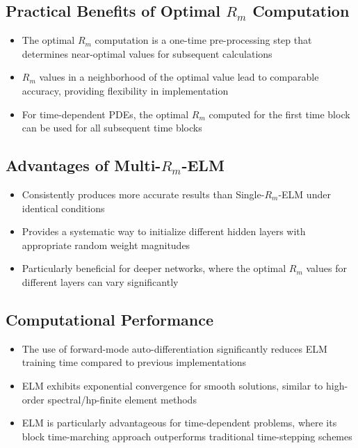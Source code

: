 \documentclass[11pt,a4paper]{article}
\begin{document}
\subsection{Practical Benefits of Optimal $R_m$ Computation}

\begin{itemize}
    \item The optimal $R_m$ computation is a one-time pre-processing step that determines near-optimal values for subsequent calculations
    \item $R_m$ values in a neighborhood of the optimal value lead to comparable accuracy, providing flexibility in implementation
    \item For time-dependent PDEs, the optimal $R_m$ computed for the first time block can be used for all subsequent time blocks
\end{itemize}

\subsection{Advantages of Multi-$R_m$-ELM}

\begin{itemize}
    \item Consistently produces more accurate results than Single-$R_m$-ELM under identical conditions
    \item Provides a systematic way to initialize different hidden layers with appropriate random weight magnitudes
    \item Particularly beneficial for deeper networks, where the optimal $R_m$ values for different layers can vary significantly
\end{itemize}

\subsection{Computational Performance}

\begin{itemize}
    \item The use of forward-mode auto-differentiation significantly reduces ELM training time compared to previous implementations
    \item ELM exhibits exponential convergence for smooth solutions, similar to high-order spectral/hp-finite element methods
    \item ELM is particularly advantageous for time-dependent problems, where its block time-marching approach outperforms traditional time-stepping schemes
\end{itemize}
\end{document}

